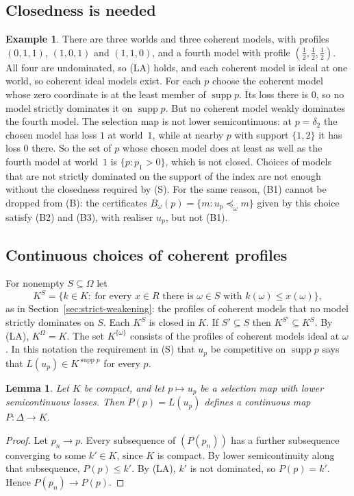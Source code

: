 \documentclass[11pt]{article}
\newtheorem{lemma}[theorem]{Lemma}
\theoremstyle{definition}
\newtheorem{example}[theorem]{Example}
\theoremstyle{remark}
\newcommand{\supp}{\operatorname{supp}}
\begin{document}
\subsection{Closedness is needed}
\begin{example}\label{ex:continuity-needed}
There are three worlds and three coherent models, with profiles $(0,1,1)$, $(1,0,1)$ and $(1,1,0)$, and a fourth model with profile $(\tfrac12,\tfrac12,\tfrac12)$. All four are undominated, so (LA) holds, and each coherent model is ideal at one world, so coherent ideal models exist. For each $p$ choose the coherent model whose zero coordinate is at the least member of $\supp p$. Its loss there is $0$, so no model strictly dominates it on $\supp p$. But no coherent model weakly dominates the fourth model. The selection map is not lower semicontinuous: at $p=\delta_2$ the chosen model has loss $1$ at world~$1$, while at nearby $p$ with support $\{1,2\}$ it has loss $0$ there. So the set of $p$ whose chosen model does at least as well as the fourth model at world~$1$ is $\{p:p_1>0\}$, which is not closed. Choices of models that are not strictly dominated on the support of the index are not enough without the closedness required by (S). For the same reason, (B1) cannot be dropped from (B): the certificates $B_\omega(p)=\{m:u_p\preceq_\omega m\}$ given by this choice satisfy (B2) and (B3), with realiser $u_p$, but not (B1).
\end{example}

\subsection{Continuous choices of coherent profiles}\label{sec:connect}
For nonempty $S\subseteq\Omega$ let
\[
 K^S=\{k\in K:\ \text{for every }x\in R\text{ there is }\omega\in S\text{ with }k(\omega)\le x(\omega)\},
\]
as in Section~\ref{sec:strict-weakening}: the profiles of coherent models that no model strictly dominates on $S$. Each $K^S$ is closed in $K$. If $S'\subseteq S$ then $K^{S'}\subseteq K^S$. By (LA), $K^\Omega=K$. The set $K^{\{\omega\}}$ consists of the profiles of coherent models ideal at $\omega$. In this notation the requirement in (S) that $u_p$ be competitive on $\supp p$ says that $L(u_p)\in K^{\supp p}$ for every $p$.

\begin{lemma}\label{lem:profcont}
Let $K$ be compact, and let $p\mapsto u_p$ be a selection map with lower semicontinuous losses. Then $P(p)=L(u_p)$ defines a continuous map $P:\Delta\to K$.
\end{lemma}
\begin{proof}
Let $p_n\to p$. Every subsequence of $(P(p_n))$ has a further subsequence converging to some $k'\in K$, since $K$ is compact. By lower semicontinuity along that subsequence, $P(p)\le k'$. By (LA), $k'$ is not dominated, so $P(p)=k'$. Hence $P(p_n)\to P(p)$.
\end{proof}
\end{document}
